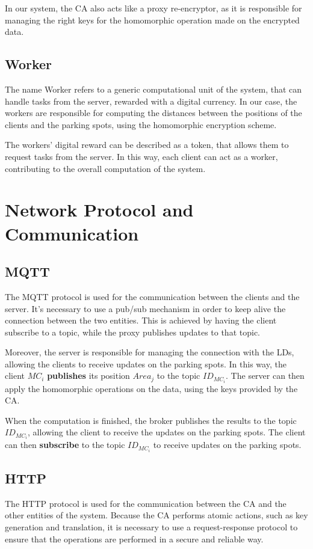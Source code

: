 In our system, the CA also acts like a proxy re-encryptor\cite{POLYAKOV2017FastPRE}, as it is responsible for managing the right keys for the homomorphic operation made on the encrypted data. 

\subsection{Worker}
The name Worker refers to a generic computational unit of the system, that can handle tasks from the server, rewarded with a digital currency. In our case, the workers are responsible for computing the distances between the positions of the clients and the parking spots, using the homomorphic encryption scheme. 

The workers' digital reward can be described as a token, that allows them to request tasks from the server. In this way, each client can act as a worker, contributing to the overall computation of the system.

\section{Network Protocol and Communication}
\subsection{MQTT}

The MQTT protocol is used for the communication between the clients and the server. It's necessary to use a pub/sub mechanism in order to keep alive the connection between the two entities. This is achieved by having the client subscribe to a topic, while the proxy publishes updates to that topic.

Moreover, the server is responsible for managing the connection with the LDs, allowing the clients to receive updates on the parking spots. In this way, the client $MC_i$ \textbf{publishes} its position $Area_j$ to the topic $ID_{MC_i}$. The server can then apply the homomorphic operations on the data, using the keys provided by the CA.

When the computation is finished, the broker publishes the results to the topic $ID_{MC_i}$, allowing the client to receive the updates on the parking spots. The client can then \textbf{subscribe} to the topic $ID_{MC_i}$ to receive updates on the parking spots.

\subsection{HTTP}
The HTTP protocol is used for the communication between the CA and the other entities of the system. Because the CA performs atomic actions, such as key generation and translation, it is necessary to use a request-response protocol to ensure that the operations are performed in a secure and reliable way.

